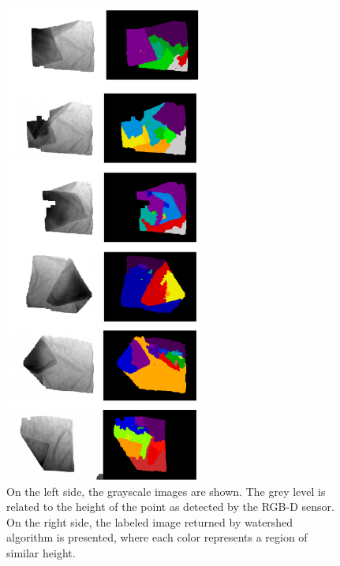 \begin{figure}[thpb]
    \centering
    \includegraphics[width=0.58\textwidth]{figures/colour_garment.pdf}
    \caption{On the left side, the grayscale images are shown. The grey level is related to the height of the point as detected by the RGB-D sensor. On the right side, the labeled image returned by watershed algorithm is presented, where each color represents a region of similar height.}
    \label{fig:watershed_labels}
\end{figure}